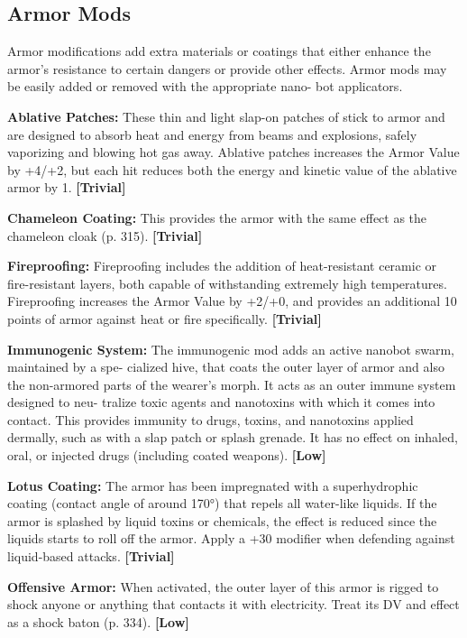 \subsection{Armor Mods}

Armor modifications add extra materials or coatings 
that either enhance the armor's resistance to certain 
dangers or provide other effects. Armor mods may be 
easily added or removed with the appropriate nano-
bot applicators.

\textbf{Ablative Patches:} These thin and light slap-on 
patches of stick to armor and are designed to absorb 
heat and energy from beams and explosions, safely 
vaporizing and blowing hot gas away. Ablative 
patches increases the Armor Value by +4/+2, but each 
hit reduces both the energy and kinetic value of the 
ablative armor by 1. \textbf{[Trivial]}

\textbf{Chameleon Coating:} This provides the armor with 
the same effect as the chameleon cloak (p. 315). \textbf{[Trivial]}

\textbf{Fireproofing: }Fireproofing includes the addition of 
heat-resistant ceramic or fire-resistant layers, both 
capable of withstanding extremely high temperatures. 
Fireproofing increases the Armor Value by +2/+0, and 
provides an additional 10 points of armor against 
heat or fire specifically. \textbf{[Trivial]}

\textbf{Immunogenic System:} The immunogenic mod 
adds an active nanobot swarm, maintained by a spe-
cialized hive, that coats the outer layer of armor and 
also the non-armored parts of the wearer's morph. 
It acts as an outer immune system designed to neu-
tralize toxic agents and nanotoxins with which it 
comes into contact. This provides immunity to drugs, 
toxins, and nanotoxins applied dermally, such as 
with a slap patch or splash grenade. It has no effect 
on inhaled, oral, or injected drugs (including coated 
weapons). \textbf{[Low]}

\textbf{Lotus Coating:} The armor has been impregnated 
with a superhydrophic coating (contact angle of 
around 170°) that repels all water-like liquids. If the 
armor is splashed by liquid toxins or chemicals, the 
effect is reduced since the liquids starts to roll off the 
armor. Apply a +30 modifier when defending against 
liquid-based attacks. \textbf{[Trivial]}

\textbf{Offensive Armor: }When activated, the outer layer of 
this armor is rigged to shock anyone or anything that 
contacts it with electricity. Treat its DV and effect as a 
shock baton (p. 334). \textbf{[Low]}

